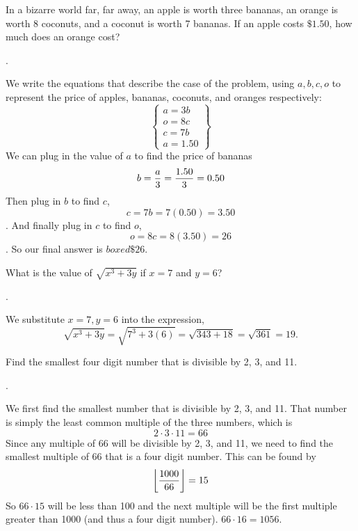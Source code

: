 \documentclass[11pt]{article}
\DeclareRobustCommand{\frac}[3][0pt]{%
  {\begingroup\hspace{#1}#2\hspace{#1}\endgroup\over\hspace{#1}#3\hspace{#1}}}
\begin{document}
\begin{problem}In a bizarre world far, far away, an apple is worth three bananas, an orange is worth 8 coconuts, and a coconut is worth 7 bananas. If an apple costs $\$1.50$, how much does an orange cost?
\end{problem}
\begin{answer}
.
\end{answer}
\begin{solution}
We write the equations that describe the case of the problem, using $a, b, c, o$ to represent the price of apples, bananas, coconuts, and oranges respectively:
 \[
	\left\{
            	\begin{array}{ll}
              	a=3b\\
              	o=8c\\
              	c=7b \\
a=1.50
            	\end{array}
	\right\}
  \]
We can plug in the value of $a$ to find the price of bananas
$$b=\frac{a}{3} = \frac{1.50}{3} = 0.50$$
Then plug in $b$ to find $c$,
$$c=7b = 7(0.50) = 3.50$$.
And finally plug in $c$ to find $o$,
$$o=8c=8(3.50)=26$$.
So our final answer is $boxed{\$ 26}$.
\end{solution}


\begin{problem}What is the value of $\sqrt{x^{3}+3y}$ if $x=7$ and $y=6$?
\end{problem}
\begin{answer}
.
\end{answer}
\begin{solution}
We substitute $x=7, y=6$ into the expression,
$$\sqrt{x^{3}+3y}=\sqrt{7^3+3(6)}=\sqrt{343+18}=\sqrt{361}=\boxed{19}.$$
\end{solution}

\begin{problem}Find the smallest four digit number that is divisible by 2, 3, and 11.
\end{problem}
\begin{answer}
.
\end{answer}
\begin{solution}
We first find the smallest number that is divisible by 2, 3, and 11. That number is simply the least common multiple of the three numbers, which is
$$2\cdot 3\cdot 11=66$$
Since any multiple of 66 will be divisible by 2, 3, and 11, we need to find the smallest multiple of 66 that is a four digit number. This can be found by
$$\floor{\frac{1000}{66}}=15$$
So $66 \cdot 15$ will be less than 100 and the next multiple will be the first multiple greater than 1000 (and thus a four digit number). $66 \cdot 16 = \boxed{1056}.$
\end{solution}
\end{document}
